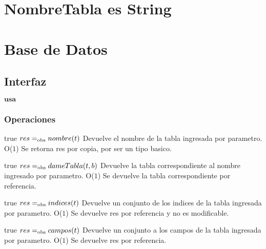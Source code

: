 


\section{NombreTabla es String}

\section{Base de Datos}

\subsection{Interfaz}

$\textbf{usa}$  


\subsubsection*{Operaciones}


%
 {true}
 {$res =_{\mathrm{obs}} nombre(t)$}
 {Devuelve el nombre de la tabla ingresada por parametro.}
 {O($1$)}
 {Se retorna res por copia, por ser un tipo basico.}

 {true}
 {$res =_{\mathrm{obs}} dameTabla(t,b)$}
 {Devuelve la tabla correspondiente al nombre ingresado por parametro.}
 {O($1$)}
 {Se devuelve la tabla correspondiente por referencia.}

 {true}
 {$res =_{\mathrm{obs}} indices(t)$}
 {Devuelve un conjunto de los indices de la tabla ingresada por parametro.}
 {O($1$)}
 {Se devuelve res por referencia y no es modificable.}
 
 {true}
 {$res =_{\mathrm{obs}} campos(t)$}
 {Devuelve un conjunto a los campos de la tabla ingresada por parametro.}
 {O($1$)}
 {Se devuelve res por referencia.}

